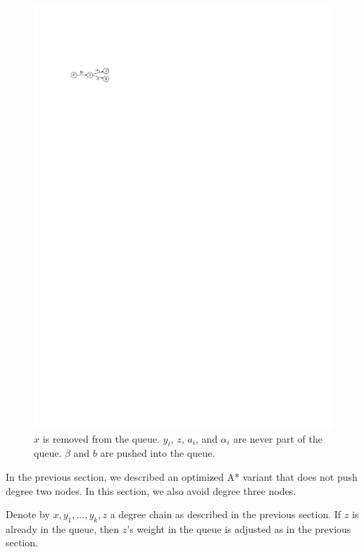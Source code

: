 \documentclass[a4paper,UKenglish,cleveref, autoref]{lipics-v2019}
\begin{document}
\begin{figure}

\begin{center}
\includegraphics{push-deg3}
\end{center}

\caption{$x$ is removed from the queue. $y_i$, $z$, $a_i$, and $\alpha_i$ are never part of the queue. $\beta$ and $b$ are pushed into the queue.}
\label{fig:push-deg3}

\end{figure}


In the previous section, we described an optimized A* variant that does not push degree two nodes.
In this section, we also avoid degree three nodes.

Denote by $x,y_1,\ldots, y_k, z$ a degree chain as described in the previous section.
If $z$ is already in the queue, then $z$'s weight in the queue is adjusted as in the previous section.
\end{document}
